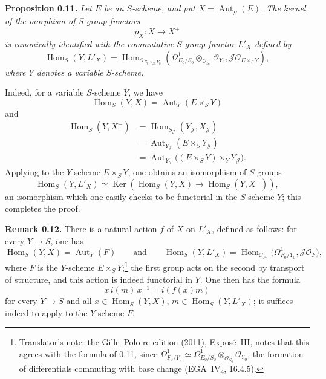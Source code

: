 

\medskip
\noindent{}\textbf{Proposition 0.11.}
\textit{Let \(E\) be an \(S\)-scheme, and put
\(X=\underline{\operatorname{Aut}}_S(E)\). The kernel of the morphism of
\(S\)-group functors}
\[
 p_X:X\longrightarrow X^+
\]
\textit{is canonically identified with the commutative \(S\)-group functor
\(L'_X\) defined by}
\[
 \operatorname{Hom}_S(Y,L'_X)
 =\operatorname{Hom}_{\mathscr O_{E_0\times_{S_0}Y_0}}
 \left(
   \Omega^1_{E_0/S_0}\otimes_{\mathscr O_{S_0}}\mathscr O_{Y_0},
   \mathscr J\mathscr O_{E\times_S Y}
 \right),
\]
\textit{where \(Y\) denotes a variable \(S\)-scheme.}

Indeed, for a variable \(S\)-scheme \(Y\), we have
\[
 \operatorname{Hom}_S(Y,X)=\operatorname{Aut}_Y(E\times_S Y)
\]
and
\begin{align*}
 \operatorname{Hom}_S(Y,X^+)
  &=\operatorname{Hom}_{S_{\mathscr J}}(Y_{\mathscr J},X_{\mathscr J})\\
  &=\operatorname{Aut}_{Y_{\mathscr J}}(E\times_S Y_{\mathscr J})\\
  &=\operatorname{Aut}_{Y_{\mathscr J}}
    \bigl((E\times_S Y)\times_Y Y_{\mathscr J}\bigr).
\end{align*}
Applying  to the \(Y\)-scheme \(E\times_S Y\), one obtains an
isomorphism of \(S\)-groups
\[
 \operatorname{Hom}_S(Y,L'_X)
 \simeq
 \operatorname{Ker}\!\left(
   \operatorname{Hom}_S(Y,X)\longrightarrow
   \operatorname{Hom}_S(Y,X^+)
 \right),
\]
an isomorphism which one easily checks to be functorial in the
\(S\)-scheme \(Y\); this completes the proof.

\medskip
\noindent{}\textbf{Remark 0.12.}
There is a natural action \(f\) of \(X\) on \(L'_X\), defined as follows: for
every \(Y\to S\), one has
\[
 \operatorname{Hom}_S(Y,X)=\operatorname{Aut}_Y(F)
 \qquad\text{and}\qquad
 \operatorname{Hom}_S(Y,L'_X)
 =\operatorname{Hom}_{\mathscr O_{F_0}}
 \bigl(\Omega^1_{F_0/Y_0},\mathscr J\mathscr O_F\bigr),
\]
where \(F\) is the \(Y\)-scheme \(E\times_SY\);\footnote{Translator's note: the Gille--Polo re-edition (2011), Exposé~III, notes
that this agrees with the formula of 0.11, since
\(\Omega^1_{F_0/Y_0}\simeq\Omega^1_{E_0/S_0}\otimes_{\mathscr O_{S_0}}
\mathscr O_{Y_0}\), the formation of differentials commuting with base change
(EGA~IV\textsubscript{4}, 16.4.5).} the first group acts on the second by
transport of structure, and this action is indeed functorial in \(Y\). One
then has the formula
\[
 x\,i(m)\,x^{-1}=i(f(x)m)
\]
for every \(Y\to S\) and all \(x\in\operatorname{Hom}_S(Y,X)\),
\(m\in\operatorname{Hom}_S(Y,L'_X)\); it suffices indeed to apply
 to the \(Y\)-scheme \(F\).


